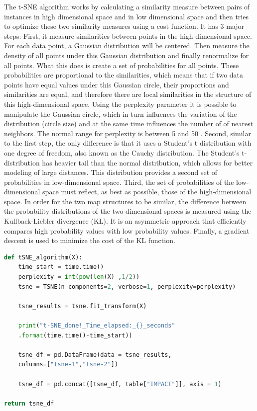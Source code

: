 The t-SNE algorithm works by calculating a similarity measure between pairs of instances in high dimensional space and in low dimensional space and then tries to optimize these two similarity measures using a cost function. It has 3 major steps: First, it measure similarities between points in the high dimensional space. For each data point, a Gaussian distribution will be centered. Then measure the density of all points under this Gaussian distribution and finally renormalize for all points. What this does is create a set of probabilities for all points. These probabilities are proportional to the similarities, which means that if two data points have equal values under this Gaussian circle, their proportions and similarities are equal, and therefore there are local similarities in the structure of this high-dimensional space. Using the perplexity parameter it is possible to manipulate the Gaussian circle, which in turn influences the variation of the distribution (circle size) and at the same time influences the number of  of nearest neighbors. The normal range for perplexity is between 5 and 50 \cite{scikit-learn}. Second, similar to the first step, the only difference is that it uses a Student's t distribution with one degree of freedom, also known as the Cauchy distribution. The Student's t-distribution has heavier tail than the normal distribution, which allows for better modeling of large distances. This distribution provides a second set of probabilities in low-dimensional space. Third, the set of probabilities of the low-dimensional space must reflect, as best as possible, those of the high-dimensional space. In order for the two map structures to be similar, the difference between the probability distributions of the two-dimensional spaces is measured using the Kullback-Liebler divergence (KL). It is an asymmetric approach that efficiently compares high probability values with low probability values. Finally, a gradient descent is used to minimize the cost of the KL function.

\begin{lstlisting}[language=Python]
def tSNE_algorithm(X):
    time_start = time.time()
    perplexity = int(pow(len(X) ,1/2))
    tsne = TSNE(n_components=2, verbose=1, perplexity=perplexity)
    
    tsne_results = tsne.fit_transform(X)
    
    print("t-SNE_done!_Time_elapsed:_{}_seconds"
    .format(time.time()-time_start))
    
    tsne_df = pd.DataFrame(data = tsne_results,
    columns=["tsne-1","tsne-2"])
    
    tsne_df = pd.concat([tsne_df, table["IMPACT"]], axis = 1)

return tsne_df
\end{lstlisting}

